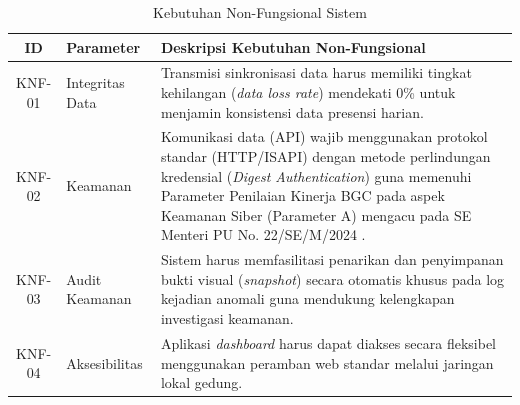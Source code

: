 \begin{table}[t]
    \centering
    \caption{Kebutuhan Non-Fungsional Sistem}
    \label{tab:kebutuhan_nonfungsional_sistem}
    \begin{tabular}{|c|l|p{9cm}|}
        \hline
        \textbf{ID} & \textbf{Parameter} & \textbf{Deskripsi Kebutuhan Non-Fungsional} \\
        \hline
        KNF-01 & Integritas Data & Transmisi sinkronisasi data harus memiliki tingkat kehilangan (\textit{data loss rate}) mendekati 0\% untuk menjamin konsistensi data presensi harian. \\
        \hline
        KNF-02 & Keamanan & Komunikasi data (API) wajib menggunakan protokol standar (HTTP/ISAPI) dengan metode perlindungan kredensial (\textit{Digest Authentication}) guna memenuhi Parameter Penilaian Kinerja BGC pada aspek Keamanan Siber (Parameter A) mengacu pada SE Menteri PU No. 22/SE/M/2024 \autocite{pu2024se22}. \\
        \hline
        KNF-03 & Audit Keamanan & Sistem harus memfasilitasi penarikan dan penyimpanan bukti visual (\textit{snapshot}) secara otomatis khusus pada log kejadian anomali guna mendukung kelengkapan investigasi keamanan. \\
        \hline
        KNF-04 & Aksesibilitas & Aplikasi \textit{dashboard} harus dapat diakses secara fleksibel menggunakan peramban web standar melalui jaringan lokal gedung. \\
        \hline
    \end{tabular}
\end{table}